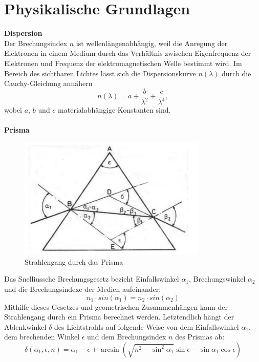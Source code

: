 \documentclass[12pt,a4paper]{article}
\begin{document}
\section{Physikalische Grundlagen}
\textbf{Dispersion}\\
Der Brechungsindex $n$ ist wellenlängenabhängig, weil die Anregung der Elektronen in einem Medium durch das Verhältnis zwischen Eigenfrequenz der Elektronen und Frequenz der elektromagnetischen Welle bestimmt wird. Im Bereich des sichtbaren Lichtes lässt sich die Dispersionskurve $n(\lambda)$ durch die Cauchy-Gleichung annähern
\begin{equation}\label{eq:Cauchy-Gleichung}
n(\lambda)=a+\frac{b}{\lambda^2}+\frac{c}{\lambda^4},
\end{equation}
wobei $a$, $b$ und $c$ materialabhängige Konstanten sind.\\\\
\textbf{Prisma}
\begin{figure}[H]
	\centering
	\includegraphics[width=0.8\textwidth]{Prisma_Strahlengang.png}
	\caption{Strahlengang durch das Prisma}
	\label{Prisma_Strahlengang}
\end{figure}
Das Snelliussche Brechungsgesetz bezieht Einfallswinkel $\alpha_1$, Brechungswinkel $\alpha_2$ und die Brechungsindexe der Medien aufeinander:
\begin{equation}
n_1 \cdot sin(\alpha_1) = n_2 \cdot sin(\alpha_2)
\end{equation}
Mithilfe dieses Gesetzes und geometrischen Zusammenhängen kann der Strahlengang durch ein Prisma berechnet werden. Letztendlich hängt der Ablenkwinkel $\delta$ des Lichtstrahls auf folgende Weise von dem Einfallswinkel $\alpha_1$, dem brechenden Winkel $\epsilon$ und dem Brechungsindex $n$ des Prismas ab:
\begin{equation}
\delta(\alpha_1,\epsilon,n)=\alpha_1-\epsilon+\arcsin{\left(\sqrt{n^2-\sin^2{\alpha_1}}\sin{\epsilon}-\sin{\alpha_1}\cos{\epsilon}\right)}
\end{equation}
\end{document}
